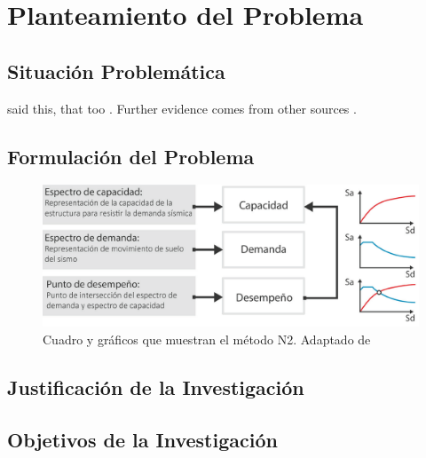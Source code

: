 \section{Planteamiento del Problema}

\subsection{Situación Problemática}

\Textcite{vonDavier2011} said this, that
too \parencite{vonDavier2011,Lassen2006}.  Further evidence comes from
other sources \parencite{Shotton1989,Lassen2006}.  

\lipsum[3]

\lipsum[4]

\subsection{Formulación del Problema}

\lipsum[5]

\begin{figure}[!ht]
	\centering
  \includegraphics[scale=0.36]{E_IMAGENES/3_Capitulo3/Cap3_Imagen70.png}
	\caption{\centering\footnotesize Cuadro y gráficos que muestran el método N2. Adaptado de \cite{deWaal2009}}
	\label{Cap3_Figura8}
\end{figure}

\subsection{Justificación de la Investigación}

\lipsum[6]

\subsection{Objetivos de la Investigación}

\lipsum[7]

